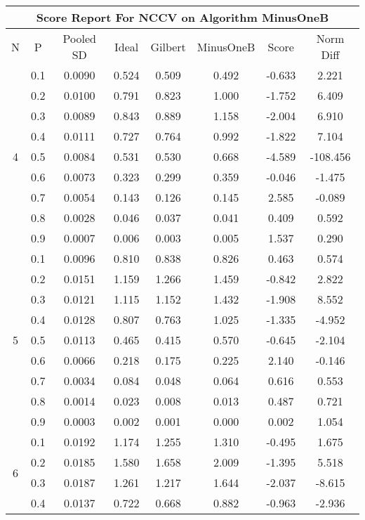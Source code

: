 \documentclass[11pt,a4paper]{report}
\begin{document}
\begin{longtable}{ | c | c || c | c | c | c | c | c | }
\hline
\multicolumn{8}{|c|}{ Score Report For NCCV on Algorithm MinusOneB} \\
\hline
N & P & Pooled SD &  Ideal &  Gilbert & MinusOneB  & Score & Norm Diff \\
 \hline
 \hline
 \endhead
\multirow{9}{*}{4} & 0.1 & 0.0090 & 0.524 & 0.509 & 0.492 & -0.633 & 2.221 \\
 & 0.2 & 0.0100 & 0.791 & 0.823 & 1.000 & -1.752 & 6.409 \\
 & 0.3 & 0.0089 & 0.843 & 0.889 & 1.158 & -2.004 & 6.910 \\
 & 0.4 & 0.0111 & 0.727 & 0.764 & 0.992 & -1.822 & 7.104 \\
 & 0.5 & 0.0084 & 0.531 & 0.530 & 0.668 & -4.589 & -108.456 \\
 & 0.6 & 0.0073 & 0.323 & 0.299 & 0.359 & -0.046 & -1.475 \\
 & 0.7 & 0.0054 & 0.143 & 0.126 & 0.145 & 2.585 & -0.089 \\
 & 0.8 & 0.0028 & 0.046 & 0.037 & 0.041 & 0.409 & 0.592 \\
 & 0.9 & 0.0007 & 0.006 & 0.003 & 0.005 & 1.537 & 0.290 \\
 \hline
\multirow{9}{*}{5} & 0.1 & 0.0096 & 0.810 & 0.838 & 0.826 & 0.463 & 0.574 \\
 & 0.2 & 0.0151 & 1.159 & 1.266 & 1.459 & -0.842 & 2.822 \\
 & 0.3 & 0.0121 & 1.115 & 1.152 & 1.432 & -1.908 & 8.552 \\
 & 0.4 & 0.0128 & 0.807 & 0.763 & 1.025 & -1.335 & -4.952 \\
 & 0.5 & 0.0113 & 0.465 & 0.415 & 0.570 & -0.645 & -2.104 \\
 & 0.6 & 0.0066 & 0.218 & 0.175 & 0.225 & 2.140 & -0.146 \\
 & 0.7 & 0.0034 & 0.084 & 0.048 & 0.064 & 0.616 & 0.553 \\
 & 0.8 & 0.0014 & 0.023 & 0.008 & 0.013 & 0.487 & 0.721 \\
 & 0.9 & 0.0003 & 0.002 & 0.001 & 0.000 & 0.002 & 1.054 \\
 \hline
\multirow{9}{*}{6} & 0.1 & 0.0192 & 1.174 & 1.255 & 1.310 & -0.495 & 1.675 \\
 & 0.2 & 0.0185 & 1.580 & 1.658 & 2.009 & -1.395 & 5.518 \\
 & 0.3 & 0.0187 & 1.261 & 1.217 & 1.644 & -2.037 & -8.615 \\
 & 0.4 & 0.0137 & 0.722 & 0.668 & 0.882 & -0.963 & -2.936 \\

\end{longtable}
\end{document}
